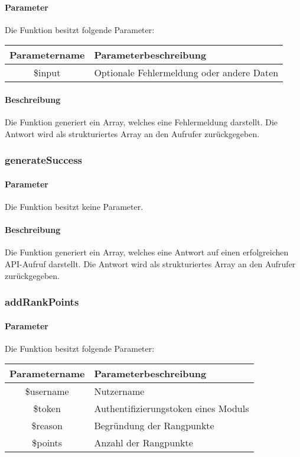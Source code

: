 \paragraph{Parameter} Die Funktion besitzt folgende Parameter:
\begin{table}[H]
	\begin{tabular}{|c|p{11cm}|}
		\hline
		\textbf{Parametername} & \textbf{Parameterbeschreibung} \\ \hline
		\$input & Optionale Fehlermeldung oder andere Daten \\ \hline
	\end{tabular}
\end{table}
\paragraph{Beschreibung} Die Funktion generiert ein Array, welches eine Fehlermeldung darstellt. Die Antwort wird als strukturiertes Array an den Aufrufer zurückgegeben.
\subsubsection{generateSuccess}
\paragraph{Parameter} Die Funktion besitzt keine Parameter.
\paragraph{Beschreibung} Die Funktion generiert ein Array, welches eine Antwort auf einen erfolgreichen API-Aufruf darstellt. Die Antwort wird als strukturiertes Array an den Aufrufer zurückgegeben.
\subsubsection{addRankPoints}
\paragraph{Parameter} Die Funktion besitzt folgende Parameter:
\begin{table}[H]
	\begin{tabular}{|c|p{11cm}|}
		\hline
		\textbf{Parametername} & \textbf{Parameterbeschreibung} \\ \hline
		\$username & Nutzername \\ \hline
		\$token    & Authentifizierungstoken eines Moduls \\ \hline
		\$reason   & Begründung der Rangpunkte \\ \hline
		\$points   & Anzahl der Rangpunkte \\ \hline
	\end{tabular}
\end{table}
